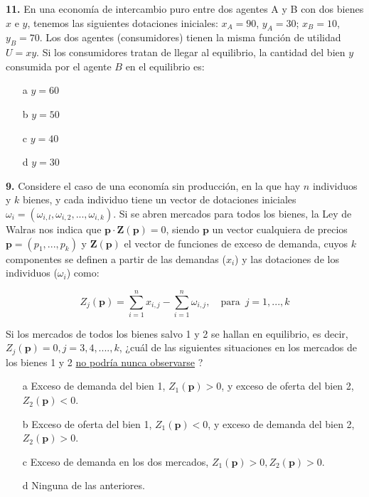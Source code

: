 \documentclass{nuevotema}
\begin{document}

\textbf{11.} En una economía de intercambio puro entre dos agentes A y B con dos bienes $x$ e $y$, tenemos las siguientes dotaciones iniciales: $x_A = 90$, $y_A = 30$; $x_B = 10$, $y_B = 70$. Los dos agentes (consumidores) tienen la misma función de utilidad $U=xy$. Si los consumidores tratan de llegar al equilibrio, la cantidad del bien $y$ consumida por el agente $B$ en el equilibrio es:

\begin{itemize}
	\item[a] $y=60$
	\item[b] $y=50$
	\item[c] $y=40$
	\item[d] $y=30$
\end{itemize}


\textbf{9.} Considere el caso de una economía sin producción, en la que hay $n$ individuos y $k$ bienes, y cada individuo tiene un vector de dotaciones iniciales $\textbf{$\omega_i$} = (\omega_{i,l}, \omega_{i,2}, ... , \omega_{i,k})$. Si se abren mercados para todos los bienes, la Ley de Walras nos indica que $\textbf{p} \cdot \textbf{Z} (\textbf{p} ) = 0$, siendo $\textbf{p}$ un vector cualquiera de precios $\textbf{p} = (p_1, ..., p_k)$ y $\textbf{Z} (\textbf{p})$ el vector de funciones de exceso de demanda, cuyos $k$ componentes se definen a partir de las demandas ($x_i$) y las dotaciones de los individuos ($\omega_i$) como:

\begin{equation*}
	Z_j (\textbf{p}) = \sum_{i=1}^n x_{i,j} - \sum_{i=1}^n \omega_{i,j}, \quad \text{para } \, j= 1, ...,k
\end{equation*}

Si los mercados de todos los bienes salvo 1 y 2 se hallan en equilibrio, es decir, $Z_j(\textbf{p}) = 0, j=3, 4, ...., k$, ¿cuál de las siguientes situaciones en los mercados de los bienes 1 y 2 \underline{no podría nunca observarse} ?

\begin{itemize}
	\item[a] Exceso de demanda del bien 1, $Z_1(\textbf{p}) >0$, y exceso de oferta del bien 2, $Z_2(\textbf{p}) < 0$. 
	\item[b] Exceso de oferta del bien 1, $Z_1(\textbf{p}) < 0$, y exceso de demanda del bien 2, $Z_2(\textbf{p}) > 0$.
	\item[c] Exceso de demanda en los dos mercados, $Z_1(\textbf{p}) >0, Z_2 (\textbf{p}) > 0$.
	\item[d] Ninguna de las anteriores.
\end{itemize}
\end{document}

